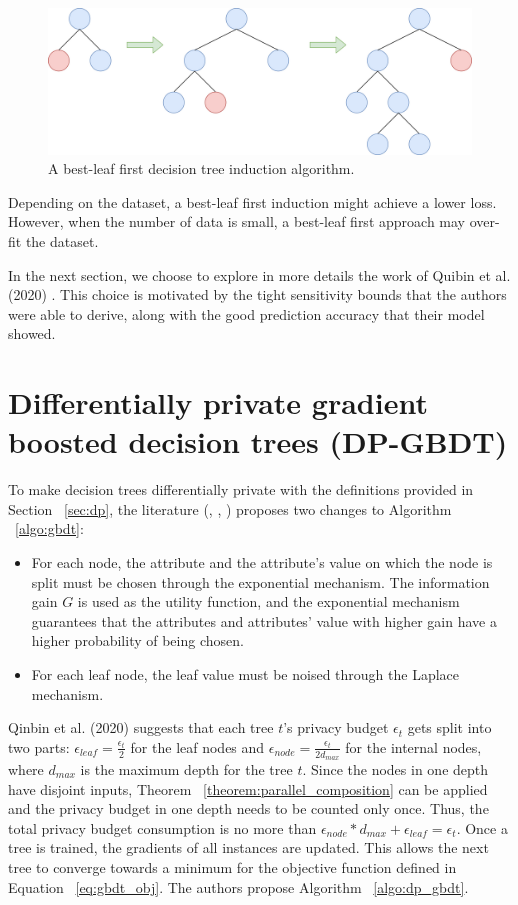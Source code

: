 \begin{figure}[h!]
	\center
	\includegraphics[scale=0.7]{images/dpgbdt/bfs}
	\caption{\label{fig:tree_bfs} A best-leaf first decision tree induction algorithm.}
\end{figure}

Depending on the dataset, a best-leaf first induction might achieve a lower loss. However, when the number of data is small, a best-leaf first approach may over-fit the dataset. 

In the next section, we choose to explore in more details the work of Quibin et al. (2020) \cite{dpgbdt}. This choice is motivated by the tight sensitivity bounds that the authors were able to derive, along with the good prediction accuracy that their model showed.


\section{Differentially private gradient boosted decision trees (DP-GBDT)}

To make decision trees differentially private with the definitions provided in Section ~\ref{sec:dp}, the literature (\cite{inprivate}, \cite{mohammed}, \cite{dpgbdt}) proposes two changes to Algorithm ~\ref{algo:gbdt}:
\begin{itemize}
	\item For each node, the attribute and the attribute's value on which the node is split must be chosen through the exponential mechanism. The information gain $G$ is used as the utility function, and the exponential mechanism guarantees that the attributes and attributes' value with higher gain have a higher probability of being chosen.
	\item For each leaf node, the leaf value must be noised through the Laplace mechanism.
\end{itemize}

Qinbin et al. (2020) \cite{dpgbdt} suggests that each tree $t$'s privacy budget $\epsilon_t$ gets split into two parts: $\epsilon_{leaf} = \frac{\epsilon_t}{2}$ for the leaf nodes and $\epsilon_{node} = \frac{\epsilon_t}{2d_{max}}$ for the internal nodes, where $d_{max}$ is the maximum depth for the tree $t$. Since the nodes in one depth have disjoint inputs, Theorem ~\ref{theorem:parallel_composition} can be applied and the privacy budget in one depth needs to be counted only once. Thus, the total privacy budget consumption is no more than $\epsilon_{node} * d_{max} + \epsilon_{leaf} = \epsilon_t$. Once a tree is trained, the gradients of all instances are updated. This allows the next tree to converge towards a minimum for the objective function defined in Equation ~\ref{eq:gbdt_obj}. The authors propose Algorithm ~\ref{algo:dp_gbdt}.

